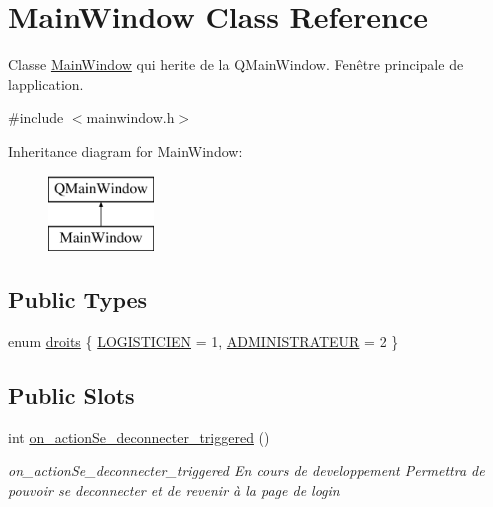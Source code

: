 \hypertarget{class_main_window}{}\section{Main\+Window Class Reference}
\label{class_main_window}


Classe \mbox{\hyperlink{class_main_window}{Main\+Window}} qui herite de la Q\+Main\+Window. Fenêtre principale de l\textquotesingle{}application.  




{\ttfamily \#include $<$mainwindow.\+h$>$}

Inheritance diagram for Main\+Window\+:\begin{figure}[H]
\begin{center}
\leavevmode
\includegraphics[height=2.000000cm]{class_main_window}
\end{center}
\end{figure}
\subsection*{Public Types}
\begin{DoxyCompactItemize}
\item 
enum \mbox{\hyperlink{class_main_window_aa16f311e2d64ddecefd3eb2e17cdf800}{droits}} \{ \mbox{\hyperlink{class_main_window_aa16f311e2d64ddecefd3eb2e17cdf800aa802020c72c77b378fc0d53e3ba4fd84}{L\+O\+G\+I\+S\+T\+I\+C\+I\+EN}} = 1, 
\mbox{\hyperlink{class_main_window_aa16f311e2d64ddecefd3eb2e17cdf800a5232288d79e5121ccec779e5d348a538}{A\+D\+M\+I\+N\+I\+S\+T\+R\+A\+T\+E\+UR}} = 2
 \}
\end{DoxyCompactItemize}
\subsection*{Public Slots}
\begin{DoxyCompactItemize}
\item 
int \mbox{\hyperlink{class_main_window_a94d1ec5b18a39e53c1700f907fb1f08e}{on\+\_\+action\+Se\+\_\+deconnecter\+\_\+triggered}} ()
\begin{DoxyCompactList}\small\item\em on\+\_\+action\+Se\+\_\+deconnecter\+\_\+triggered En cours de developpement Permettra de pouvoir se deconnecter et de revenir à la page de login \end{DoxyCompactList}\end{DoxyCompactItemize}
